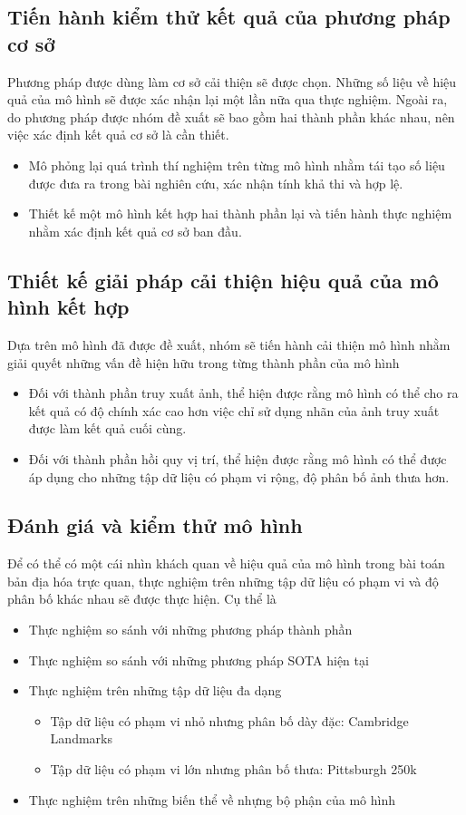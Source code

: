 \subsection{Tiến hành kiểm thử kết quả của phương pháp cơ sở}
Phương pháp được dùng làm cơ sở cải thiện sẽ được chọn. Những số liệu về hiệu quả của mô hình sẽ được xác nhận lại một lần nữa qua thực nghiệm. Ngoài ra, do phương pháp được nhóm đề xuất sẽ bao gồm hai thành phần khác nhau, nên việc xác định kết quả cơ sở là cần thiết.
\begin{itemize}
    \item Mô phỏng lại quá trình thí nghiệm trên từng mô hình nhằm tái tạo số liệu được đưa ra trong bài nghiên cứu, xác nhận tính khả thi và hợp lệ.
    \item Thiết kế một mô hình kết hợp hai thành phần lại và tiến hành thực nghiệm nhằm xác định kết quả cơ sở ban đầu.
\end{itemize}

\subsection{Thiết kế giải pháp cải thiện hiệu quả của mô hình kết hợp}
Dựa trên mô hình đã được đề xuất, nhóm sẽ tiến hành cải thiện mô hình nhằm giải quyết những vấn đề hiện hữu trong từng thành phần của mô hình
\begin{itemize}
    \item Đối với thành phần truy xuất ảnh, thể hiện được rằng mô hình có thể cho ra kết quả có độ chính xác cao hơn việc chỉ sử dụng nhãn của ảnh truy xuất được làm kết quả cuối cùng.
    \item Đối với thành phần hồi quy vị trí, thể hiện được rằng mô hình có thể được áp dụng cho những tập dữ liệu có phạm vi rộng, độ phân bố ảnh thưa hơn.
\end{itemize}

\subsection{Đánh giá và kiểm thử mô hình}
Để có thể có một cái nhìn khách quan về hiệu quả của mô hình trong bài toán bản địa hóa trực quan, thực nghiệm trên những tập dữ liệu có phạm vi và độ phân bố khác nhau sẽ được thực hiện. Cụ thể là

\begin{itemize}
    \item Thực nghiệm so sánh với những phương pháp thành phần
    \item Thực nghiệm so sánh với những phương pháp SOTA hiện tại
    \item Thực nghiệm trên những tập dữ liệu đa dạng
    \begin{itemize}
        \item Tập dữ liệu có phạm vi nhỏ nhưng phân bố dày đặc: Cambridge Landmarks
        \item Tập dữ liệu có phạm vi lớn nhưng phân bố thưa: Pittsburgh 250k
    \end{itemize}
    \item Thực nghiệm trên những biến thể về nhựng bộ phận của mô hình
\end{itemize}

